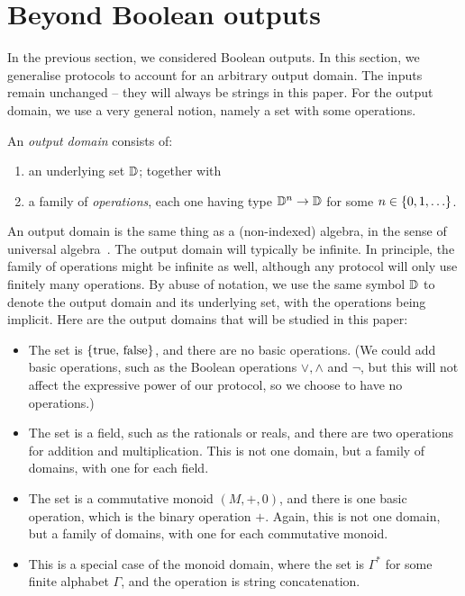 \section{Beyond Boolean outputs}
\label{sec:beyond-boolean-outputs}

In the previous section, we considered Boolean outputs. In this section, we generalise protocols to account for an arbitrary output domain. The inputs remain unchanged -- they will always be strings in this paper.  For the output domain, we use a very general notion, namely a set with some operations. 
\begin{definition}
    An \emph{output domain} consists of: 
    \begin{enumerate}
        \item an underlying set $\mathbb D$; together with
        \item a family of \emph{operations}, each one having  type $\mathbb D^n \to \mathbb D$ for some $n \in \{0,1,\ldots\}$.
    \end{enumerate}
\end{definition}
An output domain is the same thing as a (non-indexed) algebra, in the sense of universal algebra~\cite[p.5]{hobby1988structure}. 
The output domain will typically  be infinite. In principle, the family of operations might be infinite as well, although any protocol will only use finitely many operations.
By abuse of notation, we use the same symbol $\mathbb D$ to denote the output domain and its underlying set, with the operations being implicit. Here are the output domains that will be studied in this paper: 
\begin{itemize}
    \item {} The set is $\{\text{true, false}\}$, and there are no basic operations. (We could add basic operations, such as the Boolean operations $\lor,\land$ and $\neg$, but this will not affect the expressive power of our protocol, so we choose to have no operations.)
    \item {} The set is a field, such as the rationals or reals, and there are two operations for addition and multiplication. This is not one domain, but a family of domains, with one for each field.
    \item {} The set is a commutative monoid $(M,+,0)$, and there is one basic operation, which is the binary operation $+$. Again, this is not one domain, but a family of domains, with one for each commutative monoid.
    \item {} This is a special case of the monoid domain, where the set is $\Gamma^*$ for some finite alphabet $\Gamma$, and the operation is string concatenation.
\end{itemize}

